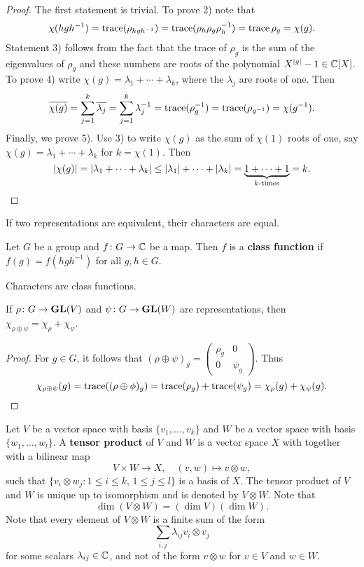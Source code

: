 \begin{proof}
	The first statement is trivial. 	To prove 2) note that
	\[
	\chi(hgh^{-1})=\operatorname{trace}(\rho_{hgh^{-1}})=\operatorname{trace}(\rho_h\rho_g\rho_h^{-1})=\operatorname{trace}\rho_g=\chi(g).
	\]
	Statement 3) follows from the fact that the trace of $\rho_g$ is the sum
	of the eigenvalues of $\rho_g$ and these numbers are roots of the polynomial
	$X^{|g|}-1\in\mathbb{C}[X]$. To prove 4) write $\chi(g)=\lambda_1+\cdots+\lambda_k$, where 
	the $\lambda_j$ are roots of one. Then
	\[
	\overline{\chi(g)}=\sum^k_{j=1}\overline{\lambda_j}
	=\sum_{j=1}^k\lambda_j^{-1}
	=\operatorname{trace}(\rho_g^{-1})
	=\operatorname{trace}(\rho_{g^{-1}})
	=\chi(g^{-1}).
	\] 
	Finally, we prove 5). Use 3) to write $\chi(g)$ as the sum of
	$\chi(1)$ roots of one, say $\chi(g)=\lambda_1+\cdots+\lambda_k$ for
	$k=\chi(1)$. Then 
	\[
	|\chi(g)|=|\lambda_1+\cdots+\lambda_k|\leq |\lambda_1|+\cdots+|\lambda_k|
	=\underbrace{1+\cdots+1}_{\text{$k$-times}}=k.\qedhere
	\]
\end{proof}

If two representations are equivalent, their characters are equal.

\begin{definition}
	Let $G$ be a group and 
	$f\colon G\to\mathbb{C}$ be a map. Then $f$ is a \textbf{class function} if
	$f(g)=f(hgh^{-1})$ for all $g,h\in G$. 	
\end{definition}

Characters are class functions. 

\begin{proposition}
    If $\rho\colon G\to\mathbf{GL}(V)$ and
    $\psi\colon G\to\mathbf{GL}(W)$ are representations, then
    $\chi_{\rho\oplus\psi}=\chi_\rho+\chi_\psi$.
\end{proposition}

\begin{proof}
  For $g\in G$, it follows that 
  $(\rho\oplus\psi)_g=
  \begin{pmatrix}
    \rho_g & 0\\ 
    0 & \psi_g
  \end{pmatrix}$. 
  Thus  
  \[
    \chi_{\rho\oplus\psi}(g)=\operatorname{trace}((\rho\oplus\phi)_g)=\operatorname{trace}(\rho_g)+\operatorname{trace}(\psi_g)=\chi_\rho(g)+\chi_\psi(g).\qedhere
  \]
\end{proof}

Let $V$ be a vector space with basis $\{v_1,\dots,v_k\}$ and 
$W$ be a vector space with basis $\{w_1,\dots,w_l\}$. A 
\textbf{tensor product} of $V$ and $W$ is a vector space $X$ with 
together with a bilinear map 
\[
V\times W\to X,
\quad
(v,w)\mapsto v\otimes w,
\]
such that $\{v_i\otimes w_j:1\leq i\leq k,\,1\leq j\leq l\}$ is a  
basis of $X$. The tensor product of $V$ and $W$ is unique up to isomorphism 
and is denoted by $V\otimes W$. Note that
\[
\dim(V\otimes W)=(\dim V)(\dim W).
\]
Note that every element of $V\otimes W$ is a finite sum 
of the form
\[
\sum_{i,j}\lambda_{ij}v_i\otimes v_j
\]
for some scalars $\lambda_{ij}\in\mathbb{C}$, 
and not of the form $v\otimes w$ for $v\in V$ and $w\in W$. 

